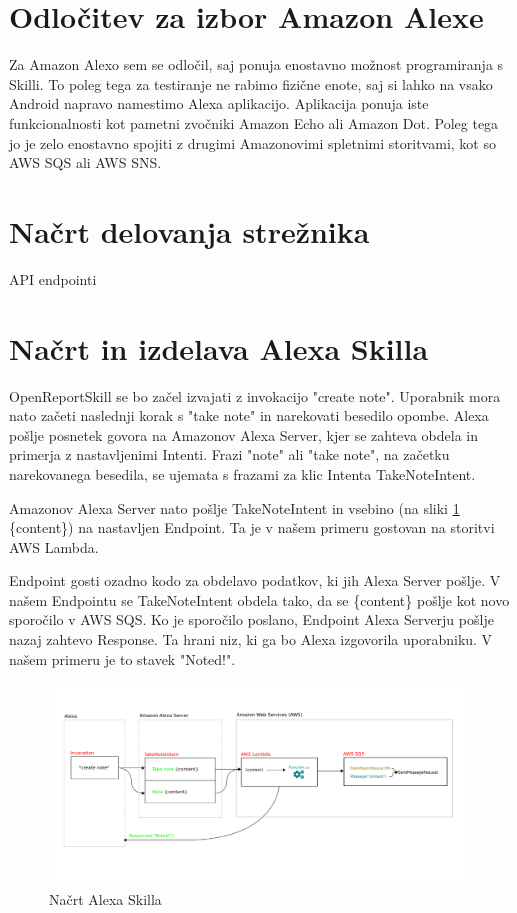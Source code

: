 \documentclass[a4paper, 12pt]{book}
\begin{document}
\section{Odločitev za izbor Amazon Alexe}

Za Amazon Alexo sem se odločil, saj ponuja enostavno možnost programiranja s Skilli.
To poleg tega za testiranje ne rabimo fizične enote, saj si lahko na vsako Android napravo namestimo Alexa aplikacijo.
Aplikacija ponuja iste funkcionalnosti kot pametni zvočniki Amazon Echo ali Amazon Dot.
Poleg tega jo je zelo enostavno spojiti z drugimi Amazonovimi spletnimi storitvami, kot so AWS SQS ali AWS SNS.

\section{Načrt delovanja strežnika}

API endpointi

\section{Načrt in izdelava Alexa Skilla}

OpenReportSkill se bo začel izvajati z invokacijo "create note".
Uporabnik mora nato začeti naslednji korak s "take note" in narekovati besedilo opombe.
Alexa pošlje posnetek govora na Amazonov Alexa Server, kjer se zahteva obdela in primerja z nastavljenimi Intenti.
Frazi "note" ali "take note", na začetku narekovanega besedila, se ujemata s frazami za klic Intenta TakeNoteIntent.

Amazonov Alexa Server nato pošlje TakeNoteIntent in vsebino (na sliki \ref{skill} \{content\}) na nastavljen Endpoint.
Ta je v našem primeru gostovan na storitvi AWS Lambda.

Endpoint gosti ozadno kodo za obdelavo podatkov, ki jih Alexa Server pošlje.
V našem Endpointu se TakeNoteIntent obdela tako, da se \{content\} pošlje kot novo sporočilo v AWS SQS.
Ko je sporočilo poslano, Endpoint Alexa Serverju pošlje nazaj zahtevo Response.
Ta hrani niz, ki ga bo Alexa izgovorila uporabniku.
V našem primeru je to stavek "Noted!".

\begin{figure}[H]
\begin{center}
\includegraphics[width=11cm]{skill}
\end{center}
\caption{Načrt Alexa Skilla}
\label{skill}
\end{figure}
\end{document}
